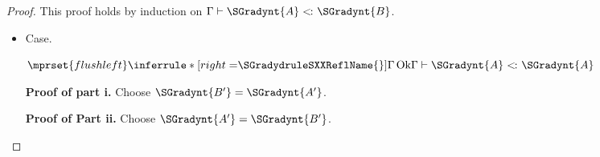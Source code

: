 \begin{proof}
  This proof holds by induction on $ \Gamma  \vdash  \SGradynt{A}  <\hspace{-2px}\colon  \SGradynt{B} $.
  \begin{itemize}
  \item[] Case.\ \\ 
    \begin{center}
      \begin{math}
        $$\mprset{flushleft}
        \inferrule* [right=$\SGradydruleSXXReflName{}$] {
           \Gamma \,\text{Ok} 
        }{ \Gamma  \vdash  \SGradynt{A}  <\hspace{-2px}\colon  \SGradynt{A} }
      \end{math}
    \end{center}        
    \textbf{Proof of part i.} Choose $\SGradynt{B'} = \SGradynt{A'}$.
    
    \noindent
    \textbf{Proof of Part ii.} Choose $\SGradynt{A'} = \SGradynt{B'}$.


\end{itemize}
\end{proof}
